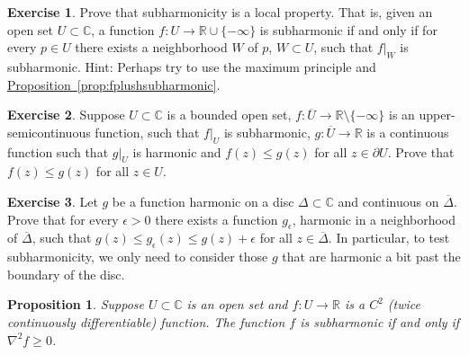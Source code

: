 \documentclass[12pt,openany]{book}
\newcommand{\C}{{\mathbb{C}}}
\newcommand{\R}{{\mathbb{R}}}
\theoremstyle{plain}
\newtheorem{prop}[thm]{Proposition}
\theoremstyle{remark}
\theoremstyle{definition}
\newenvironment{exbox}{%
    \def\FrameCommand{\vrule width 1pt \relax\hspace {10pt}}%
    \MakeFramed {\advance \hsize -\width \FrameRestore }%
}{%
    \endMakeFramed
}
\theoremstyle{exercise}
\newtheorem{exercise}{Exercise}[section]
\theoremstyle{example}
\newcommand{\propref}[1]{\hyperref[#1]{Proposition~\ref*{#1}}}
\begin{document}
\begin{exbox}
\begin{exercise}
Prove that subharmonicity is a local property.  That is, given an open set
$U \subset \C$, a function $f \colon U \to \R \cup \{ -\infty \}$ is subharmonic if
and only if for every $p \in U$ there exists a neighborhood $W$ of $p$,
$W \subset U$, such that $f|_{W}$ is subharmonic.  Hint: Perhaps try to use
the maximum principle and \propref{prop:fplushsubharmonic}.
\end{exercise}

\begin{exercise}
Suppose $U \subset \C$ is a bounded open set, $f \colon \overline{U} \to \R
\setminus \{-\infty\}$ is an upper-semicontinuous function, such that $f|_U$
is subharmonic, $g \colon \overline{U} \to \R$ is a continuous function
such that $g|_U$ is harmonic and
$f(z) \leq g(z)$ for all $z \in \partial U$.  Prove that
$f(z) \leq g(z)$ for all $z \in U$.
\end{exercise}

\begin{exercise} \label{exercise:onlyniceuneededforsubharmonic}
Let $g$ be a function
harmonic on a disc $\Delta \subset \C$ and continuous on
$\overline{\Delta}$.  Prove that for every $\epsilon > 0$ there exists
a function $g_\epsilon$, harmonic in a neighborhood of $\overline{\Delta}$,
such that $g(z) \leq g_\epsilon(z) \leq g(z)+\epsilon$ for all $z \in
\overline{\Delta}$.
In particular, to test subharmonicity, we only need to consider those
$g$ that are harmonic a bit past the boundary of the disc.
\end{exercise}
\end{exbox}

\begin{prop}
Suppose $U \subset \C$ is an open set and $f \colon U \to \R$ is a $C^2$
(twice continuously differentiable) function.
The function $f$ is subharmonic if and only if
$\nabla^2 f \geq 0$.
\end{prop}
\end{document}
